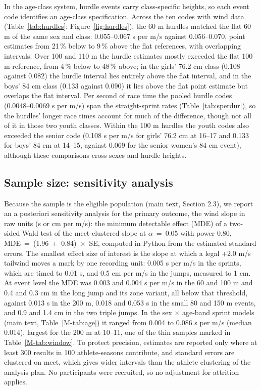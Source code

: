 \documentclass[12pt,a4paper]{article}
\begin{document}
In the age-class system, hurdle events carry class-specific heights, so each event code identifies an age-class specification. Across the ten codes with wind data (Table~\ref{tab:hurdles}; Figure~\ref{fig:hurdles}), the 60 m hurdles matched the flat 60 m of the same sex and class: 0.055--0.067 s per m/s against 0.056--0.070, point estimates from 21\,\% below to 9\,\% above the flat references, with overlapping intervals. Over 100 and 110 m the hurdle estimates mostly exceeded the flat 100 m reference, from 4\,\% below to 48\,\% above; in the girls' 76.2 cm class (0.108 against 0.082) the hurdle interval lies entirely above the flat interval, and in the boys' 84 cm class (0.133 against 0.090) it lies above the flat point estimate but overlaps the flat interval. Per second of race time the pooled hurdle codes (0.0048--0.0069 s per m/s) span the straight-sprint rates (Table~\ref{tab:sperdur}), so the hurdles' longer race times account for much of the difference, though not all of it in those two youth classes. Within the 100 m hurdles the youth codes also exceeded the senior code (0.108 s per m/s for girls' 76.2 cm at 16--17 and 0.133 for boys' 84 cm at 14--15, against 0.069 for the senior women's 84 cm event), although these comparisons cross sexes and hurdle heights.

\subsection*{Sample size: sensitivity analysis}

Because the sample is the eligible population (main text, Section 2.3), we report an a posteriori sensitivity analysis for the primary outcome, the wind slope in raw units (s or cm per m/s): the minimum detectable effect (MDE) of a two-sided Wald test of the meet-clustered slope at $\alpha$~=~0.05 with power 0.80, MDE~=~(1.96~+~0.84)~$\times$~SE, computed in Python from the estimated standard errors. The smallest effect size of interest is the slope at which a legal +2.0 m/s tailwind moves a mark by one recording unit: 0.005 s per m/s in the sprints, which are timed to 0.01 s, and 0.5 cm per m/s in the jumps, measured to 1 cm. At event level the MDE was 0.003 and 0.004 s per m/s in the 60 and 100 m and 0.4 and 0.3 cm in the long jump and its zone variant, all below that threshold, against 0.013 s in the 200 m, 0.018 and 0.053 s in the small 80 and 150 m events, and 0.9 and 1.4 cm in the two triple jumps. In the sex $\times$ age-band sprint models (main text, Table~\ref{M-tab:age}) it ranged from 0.004 to 0.086 s per m/s (median 0.014), largest for the 200 m at 10--11, one of the thin samples marked in Table~\ref{M-tab:window}. To protect precision, estimates are reported only where at least 300 results in 100 athlete-seasons contribute, and standard errors are clustered on meet, which gives wider intervals than the athlete clustering of the analysis plan. No participants were recruited, so no adjustment for attrition applies.
\end{document}
